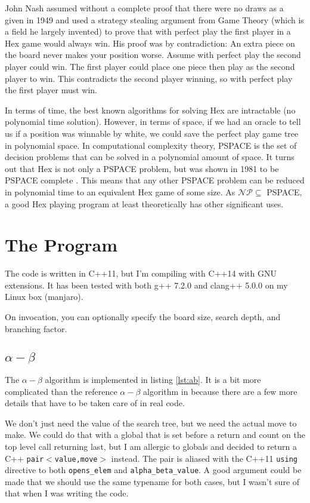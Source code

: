 \documentclass[12pt,titlepage]{amsart}
\begin{document}
John Nash assumed without a complete proof that there were no draws as a given
in 1949 and used a strategy stealing argument from Game Theory (which is a field
he largely invented) to prove that with perfect play the first player in a Hex
game would always win.  His proof was by contradiction: An extra piece on the
board never makes your position worse. Assume with perfect play the second
player could win. The first player could place one piece then play as the second
player to win. This contradicts the second player winning, so with perfect play
the first player must win.

In terms of time, the best known algorithms for solving Hex are
intractable (no polynomial time solution). However, in terms of space,
if we had an oracle to tell us if a position was winnable by white, we
could save the perfect play game tree in polynomial space.  In
computational complexity theory, PSPACE is the set of decision
problems that can be solved in a polynomial amount of space. It turns
out that Hex is not only a PSPACE problem, but was shown in 1981 to be
PSPACE complete \cite{Reisch1981}. This means that any other PSPACE
problem can be reduced in polynomial time to an equivalent Hex game of
some size. As $\mathcal{NP}\subseteq $ PSPACE, a good Hex playing
program at least theoretically has other significant uses.


\section{The Program}
\FloatBarrier

The code is written in C++11, but I'm compiling with C++14 with GNU extensions.
It has been tested with both g++ 7.2.0 and clang++ 5.0.0 on my Linux box
(manjaro).

On invocation, you can optionally specify the board size, search depth, and
branching factor.

\subsection{$\alpha-\beta$}

The $\alpha-\beta$ algorithm is implemented in listing \ref{lst:ab}. It is a bit
more complicated than the reference $\alpha-\beta$ algorithm in
\cite{RN:AIAMA:2003} because there are a few more details that have to be taken
care of in real code.

We don't just need the value of the search tree, but we need the actual move to
make. We could do that with a global that is set before a return and count on
the top level call returning last, but I am allergic to globals and decided to
return a C++ \texttt{pair$<$value,move$>$} instead. The pair is aliased with the
C++11 \texttt{using} directive to both \texttt{opens\_elem} and
\texttt{alpha\_beta\_value}. A good argument could be made that we should use
the same typename for both cases, but I wasn't sure of that when I was writing
the code.
\end{document}
